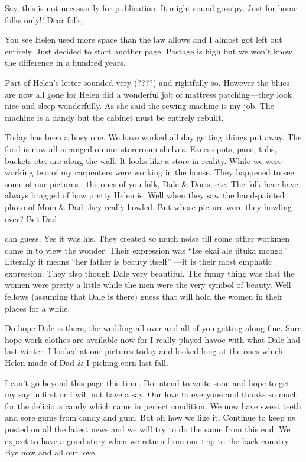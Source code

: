 \documentclass[
]{book}
\begin{document}
Say, this is not necessarily for publication. It might sound gossipy. Just for home folks only!! Dear folk,

You see Helen used more space than the law allows and I almost got left out entirely. Just decided to start another page. Postage is high but we won't know the difference in a hundred years.

Part of Helen's letter sounded very (????) and rightfully so. However the blues are now all gone for Helen did a wonderful job of mattress patching---they look nice and sleep wonderfully. As she said the sewing machine is my job. The machine is a dandy but the cabinet must be entirely rebuilt.

Today has been a busy one. We have worked all day getting things put away. The food is now all arranged on our storeroom shelves. Excess pots, pans, tubs, buckets etc. are along the wall. It looks like a store in reality. While we were working two of my carpenters were working in the house. They happened to see some of our pictures---the ones of you folk, Dale \& Doris, etc. The folk here have always bragged of how pretty Helen is. Well when they saw the hand-painted photo of Mom \& Dad they really howled. But whose picture were they howling over? Bet Dad

can guess. Yes it was his. They created so much noise till some other workmen came in to view the wonder. Their expression was ``Ise ekai ale jituka mongo.'' Literally it means ``her father is beauty itself'' ---it is their most emphatic expression. They also though Dale very beautiful. The funny thing was that the women were pretty a little while the men were the very symbol of beauty. Well fellows (assuming that Dale is there) guess that will hold the women in their places for a while.

Do hope Dale is there, the wedding all over and all of you getting along fine. Sure hope work clothes are available now for I really played havoc with what Dale had last winter. I looked at our pictures today and looked long at the ones which Helen made of Dad \& I picking corn last fall.

I can't go beyond this page this time. Do intend to write soon and hope to get my say in first or I will not have a say. Our love to everyone and thanks so much for the delicious candy which came in perfect condition. We now have sweet teeth and sore gums from candy and gum. But oh how we like it. Continue to keep us posted on all the latest news and we will try to do the same from this end. We expect to have a good story when we return from our trip to the back country. Bye now and all our love,
\end{document}
